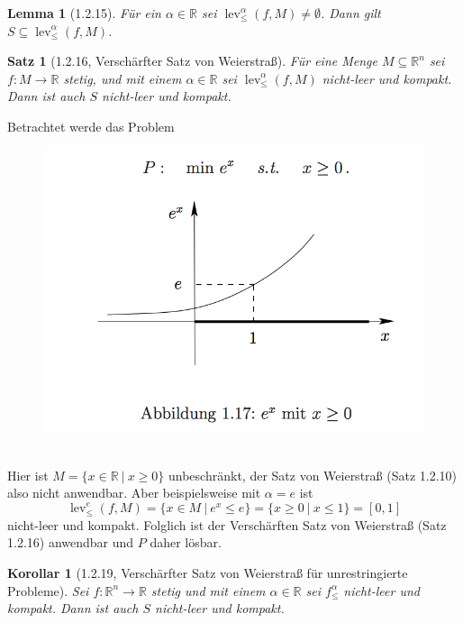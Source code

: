 \documentclass[12pt]{extreport} %
\newcommand{\R}{\mathbb{R}}
\theoremstyle{named}
\theoremstyle{nnamed}
\theoremstyle{itshape}
\newtheorem*{satz}{Satz}
\theoremstyle{normal}
\newtheorem*{korollar}{Korollar}
\newtheorem*{lemma}{Lemma}
\begin{document}
\begin{lemma}[1.2.15]
	Für ein $\alpha \in \R$ sei $\operatorname{lev}_{\leq}^{\alpha}(f, M) \neq \emptyset$. Dann gilt $S \subseteq \operatorname{lev}_{\leq}^{\alpha}(f, M)$.
\end{lemma}

\begin{satz}[1.2.16, Verschärfter Satz von Weierstraß]
	Für eine Menge $M \subseteq \R^n$ sei $f \colon M \rightarrow \R$ stetig, und mit einem $\alpha \in \R$ sei $\operatorname{lev}^{\alpha}_{\leq}(f, M)$ nicht-leer und kompakt. Dann ist auch $S$ nicht-leer und kompakt.	
\end{satz}

\begin{beispiel}
	Betrachtet werde das Problem	 ~\\
	
	\begin{figure}[h!] \centering
		\includegraphics[scale=0.5]{img/ks-i}
	\end{figure}
	~\\
	Hier ist $M = \big\{ x \in \R ~|~x \geq 0 \big\}$ unbeschränkt, der Satz von Weierstraß (Satz 1.2.10) also nicht anwendbar. Aber beispielsweise mit $\alpha = e$ ist
	$$ \operatorname{lev}_{\leq}^{e}(f, M) = \big\{ x \in M ~|~e^x \leq e \big\} = \big\{ x \geq 0 ~|~x \leq 1 \big\} = [0, 1] $$
	nicht-leer und kompakt. Folglich ist der Verschärften Satz von Weierstraß (Satz 1.2.16) anwendbar und $P$ daher lösbar.
\end{beispiel}

\begin{korollar}[1.2.19, Verschärfter Satz von Weierstraß für unrestringierte Probleme]
Sei $f \colon \R^n \rightarrow \R$ stetig und mit einem $\alpha \in \R$ sei $f_{\leq}^{\alpha}$ nicht-leer und kompakt. Dann ist auch $S$ nicht-leer und kompakt.	
\end{korollar}
\end{document}
